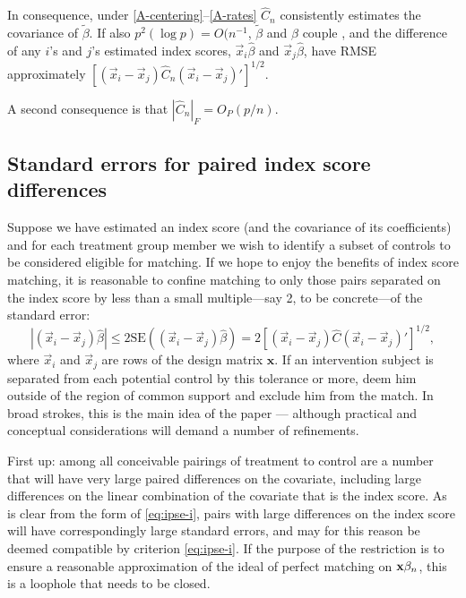 \documentclass{article}
\theoremstyle{remark}
\begin{document}
In consequence, 
under \ref{A-centering}--\ref{A-rates}  $\hat{C}_n$ consistently
estimates the covariance of $\tilde{\beta}$.  
If also $p^2(\log p) = O(n^{-1}$,  $\tilde{\beta}$ and $\hat\beta$
couple \citep[Theorem~2.2]{he2000parameters}, and the difference of any $i$'s and $j$'s estimated index scores, $\vec{x}_i\hat\beta$ and $\vec{x}_j\hat\beta$, have RMSE approximately $[(\vec{x}_i - \vec{x}_j) \hat{C}_n (\vec{x}_i - \vec{x}_j)']^{1/2}$.    

A second consequence is that $|\hat{C}_n|_F = O_P(p/n)$.

\subsection{Standard errors for paired index score differences}
Suppose we have estimated an index score (and the covariance of its
coefficients) and for each treatment group member we wish to identify a
subset of controls to be considered eligible for matching. If we hope to
enjoy the benefits of index score matching, it is reasonable to
confine matching to only those pairs separated on the index score
by less than a small multiple---say 2, to be concrete---of the standard error:
\begin{equation}
|(\vec{x}_i - \vec{x}_j)\hat{\beta}| \leq 2 \mathrm{SE}\left( (\vec{x}_i - \vec{x}_j)\hat{\beta}\right) = 2\left[  (\vec{x}_i - \vec{x}_j)\hat{C}(\vec{x}_i - \vec{x}_j)' \right]^{1/2},
\label{eq:ipse-i}
\end{equation}
where $\vec{x}_i$ and $\vec{x}_j$ are rows of the design matrix
$\mathbf{x}$. If an intervention subject is separated from each
potential control by this tolerance or more, deem him outside of the
region of common support and exclude him from the match.  In broad
strokes, this is the main idea of the paper --- although practical and
conceptual considerations will demand a number of refinements.

First up: among all conceivable pairings of treatment to control are a
number that will have very large paired differences on the covariate,
including large differences on the linear combination of the covariate
that is the index score. As is clear from the form of
\eqref{eq:ipse-i}, pairs with large differences on the index score
will have correspondingly large standard errors, and may for this reason
be deemed compatible by criterion \eqref{eq:ipse-i}. If the
purpose of the restriction is to ensure a reasonable approximation of the
ideal of perfect matching on $\mathbf{x}\beta_{n }$, this is a loophole that
needs to be closed. 
\end{document}
